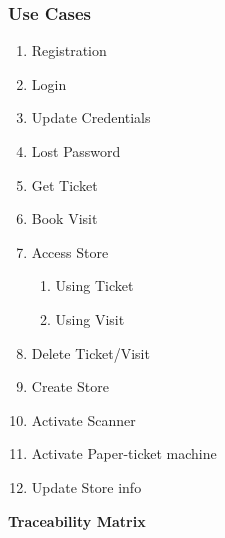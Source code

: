 \documentclass[a4paper, 10pt, oneside]{article}
\begin{document}
\subsubsection{Use Cases}
\begin{enumerate}[labelindent=20pt, label={UC.\arabic*}, itemindent=1em,leftmargin=!]
    \item Registration \label{uc:registration}
    \item Login \label{uc:login}
    \item Update Credentials \label{uc:updateCredentials}
    \item Lost Password \label{uc:lostPassword}
    \item Get Ticket \label{uc:getTicket}
    \item Book Visit \label{uc:getVisit}
    \item Access Store \label{uc:accessStore}
    \begin{enumerate}[label={-}]
        \item Using Ticket
        \item Using Visit
    \end{enumerate}
    \item Delete Ticket/Visit \label{uc:deleteBooked}
    \item Create Store \label{uc:createStore}
    \item Activate Scanner \label{uc:useScanner}
    \item Activate Paper-ticket machine \label{uc:usePaper}
    \item Update Store info \label{uc:updateStoreInfo}
\end{enumerate}
\label{uc:traceabilityMatrix}
\begin{center}
{\textbf{Traceability Matrix}}
\end{center}
\end{document}
